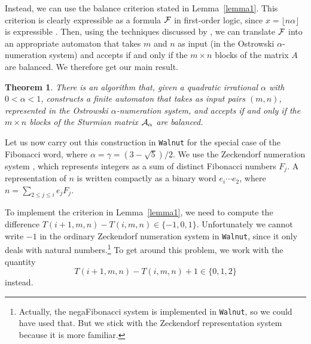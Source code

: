 \documentclass[final]{dmtcs-episciences}
\theoremstyle{plain}
\newtheorem{theorem}{Theorem}
\theoremstyle{remark}
\begin{document}
Instead, we can use the balance criterion stated in Lemma~\ref{lemma1}. This criterion is clearly expressible as a formula $\cal F$ in first-order logic, since $x = \lfloor n \alpha \rfloor$ is expressible \citep{Schaeffer&Shallit&Zorcic:2024}.  Then, using the techniques discussed by \cite{Shallit:2023}, we can translate $\cal F$ into an appropriate automaton that takes $m$ and $n$ as input (in the Ostrowski $\alpha$-numeration system) and accepts if and only if the $m \times n$ blocks of the matrix $A$ are balanced.
We therefore get our main result.
\begin{theorem}
There is an algorithm that, given a quadratic irrational
$\alpha$ with $0 < \alpha < 1$, constructs a finite automaton that takes as input pairs $(m,n)$, represented in the Ostrowski $\alpha$-numeration system, and accepts if and only if the $m \times n$ blocks of the Sturmian matrix ${\cal A}_{\alpha}$  are balanced.
\label{main}
\end{theorem}

Let us now carry out this construction in {\tt Walnut} for the special case of the Fibonacci word, where
$\alpha = \gamma = (3-\sqrt{5})/2$.  We use the Zeckendorf numeration system \citep{Lekkerkerker:1952,Zeckendorf:1972}, which represents integers as a sum of distinct Fibonacci numbers $F_j$.  A representation of $n$ is written 
compactly as a binary
word $e_i \cdots e_2$, where
$n = \sum_{2 \leq j \leq i} e_j F_j$.

To implement the criterion in Lemma~\ref{lemma1}, we need to compute the difference
$T(i+1,m,n)-T(i,m,n) \in \{ -1,0, 1\}$.
Unfortunately we cannot write $-1$ in the ordinary Zeckendorf numeration system in {\tt Walnut}, since it only deals with natural numbers.\footnote{Actually, the negaFibonacci system is implemented in {\tt Walnut}, so we could have used that.  But we stick with the Zeckendorf representation system because it is more familiar.}
To get around this problem, we work with the quantity
$$T(i+1,m,n)-T(i,m,n)+1 \in \{0,1,2 \}$$
instead.
\end{document}

